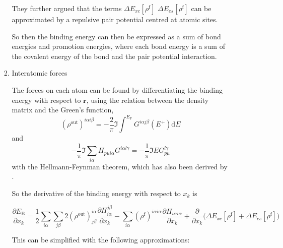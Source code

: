 \documentclass[11pt]{article}
\begin{document}
\begin{enumerate}
\begin{enumerate}
\begin{enumerate}
They further argued that the terms \(\Delta E_{xc}[\rho^{\text{f}}]\) 
\(\Delta E_{es}[\rho^{\text{f}}]\) can be approximated by a repulsive pair potential
centred at atomic sites.

So then the binding energy can then be expressed as a sum of bond energies and
promotion energies, where each bond energy is a sum of the covalent energy of
the bond and the pair potential interaction. 

\item Interatomic forces
\label{sec:org16bdedc}

The forces on each atom can be found by differentiating the binding energy
with respect to \(\mathbf{r}\), using the relation between the density matrix
and the Green's function,
\[
(\rho^{\text{out}})^{i\alpha i\beta} = -\frac{2}{\pi} \Im \int^{E_{\text{F}}} 
   G^{i\alpha j\beta} (E^{+}) \text{d}E
\]
and 
\[
 -\frac{1}{\pi} \Im \sum_{i \alpha} H_{p\mu i\alpha} G^{i\alpha l\gamma}
     =  -\frac{1}{\pi} \Im E G_{p\mu}^{l\gamma}
\]
with the Hellmann-Feynman theorem, which has also been derived by
\cite{Foulkes1989}. 

So the derivative of the binding energy with respect to \(x_k\) is 

\begin{equation}
\frac{\partial E_{\text{B}}}{\partial x_{k}} = 
   \frac{1}{2}\sum_{i\alpha}\sum_{j\beta} 2(\rho^{\text{out}})^{i\alpha}_{j\beta}
       \frac{\partial H^{j\beta}_{i\alpha}}{\partial x_{k}}
 - \sum_{i\alpha} (\rho^{\text{f}})^{i\alpha i\alpha} 
                  \frac{\partial H_{i\alpha i\alpha}}{\partial x_{k}}
 + \frac{\partial}{\partial x_{k}} \big(\Delta E_{xc}[\rho^{\text{f}}] + \Delta E_{es}[\rho^{\text{f}}] \big )
\end{equation}


This can be simplified with the following approximations:


\end{enumerate}
\end{enumerate}
\end{enumerate}
\end{document}
